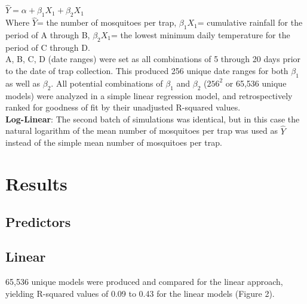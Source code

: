 \documentclass{article}
\begin{document}
\begin{multicols}{2}
$\hat{Y}=\alpha+\beta_1 X_1+\beta_2 X_1$ \\

Where $\hat{Y}$= the number of mosquitoes per trap, $\beta_1 X_1$= cumulative rainfall for the period of A through B, $\beta_2 X_1$= the lowest minimum daily temperature for the period of C through D.  \\

A, B, C, D (date ranges) were set as all combinations of 5 through 20 days prior to the date of trap collection.  This produced 256 unique date ranges for both $\beta_1$ as well as $\beta_2$.  All potential combinations  of $\beta_1$ and $\beta_2$ ($256^2$ or 65,536 unique models) were analyzed in a simple linear regression model, and retrospectively ranked for goodness of fit by their unadjusted R-squared values.  \\


\textbf{Log-Linear}: The second batch of simulations was identical, but in this case the natural logarithm of the mean number of mosquitoes per trap was used as $\hat{Y}$ instead of the simple mean number of mosquitoes per trap.  



\section*{Results}
\subsection*{Predictors}


\subsection*{Linear}
65,536 unique models were produced and compared for the linear approach, yielding R-squared values of 0.09 to 0.43 for the linear models (Figure 2).


\end{multicols}
\end{document}
